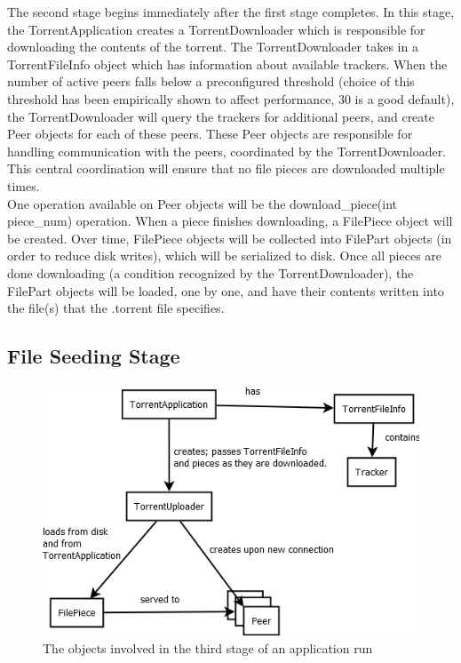 \documentclass[letter]{scrartcl}
\begin{document}
The second stage begins immediately after the first stage completes.   In this stage, the TorrentApplication creates a TorrentDownloader which is responsible for downloading the contents of the torrent.  The TorrentDownloader takes in a TorrentFileInfo object which has information about available trackers.  When the number of active peers falls below a preconfigured threshold (choice of this threshold has been empirically shown to affect performance, 30 is a good default), the TorrentDownloader will query the trackers for additional peers, and create Peer objects for each of these peers.  These Peer objects are responsible for handling communication with the peers, coordinated by the TorrentDownloader.  This central coordination will ensure that no file pieces are downloaded multiple times.\\

One operation available on Peer objects will be the download\_piece(int piece\_num) operation.  When a piece finishes downloading, a FilePiece object will be created.  Over time, FilePiece objects will be collected into FilePart objects (in order to reduce disk writes), which will be serialized to disk.  Once all pieces are done downloading (a condition recognized by the TorrentDownloader), the FilePart objects will be loaded, one by one, and have their contents written into the file(s) that the .torrent file specifies.

\subsection{File Seeding Stage}
\begin{figure}[h]
\centering
\includegraphics[scale=.5]{StepThree.png}
\caption{The objects involved in the third stage of an application run}
\end{figure}
\end{document}

